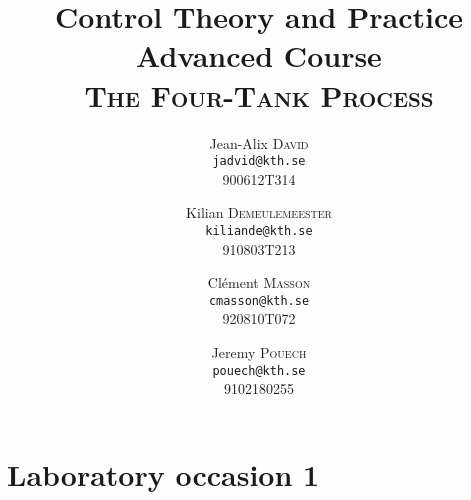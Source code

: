 \documentclass[a4paper,8pt,twocolumn]{extarticle}
\title{Control Theory and Practice \\ Advanced Course \\ \textsc{The Four-Tank Process}}
\author{Jean-Alix \textsc{David} \\ \texttt{jadvid@kth.se} \\ 900612T314 
    \and
        Kilian \textsc{Demeulemeester} \\ \texttt{kiliande@kth.se} \\ 910803T213 
    \and 
        Clément \textsc{Masson} \\ \texttt{cmasson@kth.se} \\ 920810T072
    \and
Jeremy \textsc{Pouech} \\ \texttt{pouech@kth.se} \\ 9102180255
}
\begin{document}
\setlength\parindent{0em}

\maketitle




\section{Laboratory occasion 1}



% 
% 
% 
% 
% 
% 
% 
% 
% 
% 
% 
\end{document}
